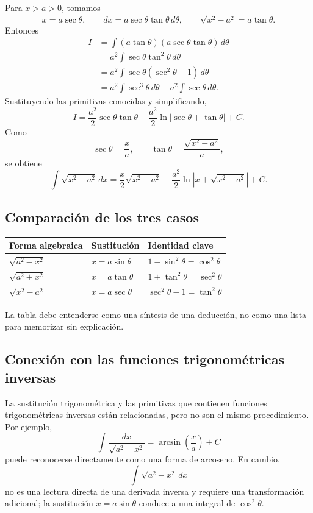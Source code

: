\documentclass[12pt]{article}
\theoremstyle{definition}
\theoremstyle{remark}
\begin{document}
Para $x>a>0$, tomamos
\[
x=a\sec\theta,
\qquad dx=a\sec\theta\tan\theta\,d\theta,
\qquad \sqrt{x^2-a^2}=a\tan\theta.
\]
Entonces
\begin{align*}
I
&=\int(a\tan\theta)(a\sec\theta\tan\theta)\,d\theta\\
&=a^2\int\sec\theta\tan^2\theta\,d\theta\\
&=a^2\int\sec\theta(\sec^2\theta-1)\,d\theta\\
&=a^2\int\sec^3\theta\,d\theta-a^2\int\sec\theta\,d\theta.
\end{align*}
Sustituyendo las primitivas conocidas y simplificando,
\[
I=\frac{a^2}{2}\sec\theta\tan\theta
-\frac{a^2}{2}\ln|\sec\theta+\tan\theta|+C.
\]
Como
\[
\sec\theta=\frac{x}{a},
\qquad
\tan\theta=\frac{\sqrt{x^2-a^2}}{a},
\]
se obtiene
\[
\boxed{
\int\sqrt{x^2-a^2}\,dx
=\frac{x}{2}\sqrt{x^2-a^2}
-\frac{a^2}{2}\ln|x+\sqrt{x^2-a^2}|+C.}
\]

\subsection*{Comparación de los tres casos}

\begin{center}
\begin{tabular}{lll}
\toprule
Forma algebraica & Sustitución & Identidad clave\\
\midrule
$\sqrt{a^2-x^2}$ & $x=a\sin\theta$ & $1-\sin^2\theta=\cos^2\theta$\\
$\sqrt{a^2+x^2}$ & $x=a\tan\theta$ & $1+\tan^2\theta=\sec^2\theta$\\
$\sqrt{x^2-a^2}$ & $x=a\sec\theta$ & $\sec^2\theta-1=\tan^2\theta$\\
\bottomrule
\end{tabular}
\end{center}

La tabla debe entenderse como una síntesis de una deducción, no como una lista para memorizar sin explicación.

\subsection*{Conexión con las funciones trigonométricas inversas}

La sustitución trigonométrica y las primitivas que contienen funciones trigonométricas inversas están relacionadas, pero no son el mismo procedimiento. Por ejemplo,
\[
\int\frac{dx}{\sqrt{a^2-x^2}}
=\arcsin\left(\frac{x}{a}\right)+C
\]
puede reconocerse directamente como una forma de arcoseno. En cambio,
\[
\int\sqrt{a^2-x^2}\,dx
\]
no es una lectura directa de una derivada inversa y requiere una transformación adicional; la sustitución $x=a\sin\theta$ conduce a una integral de $\cos^2\theta$.
\end{document}
